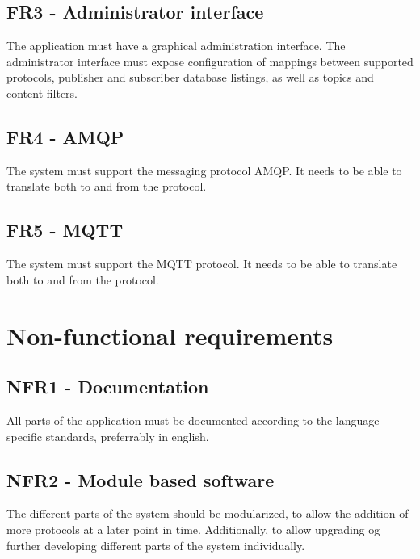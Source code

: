 \subsection{FR3 - Administrator interface}

The application must have a graphical administration interface. The administrator interface must expose configuration of mappings between supported protocols, publisher and subscriber database listings, as well as topics and content filters.

\subsection{FR4 - AMQP}

The system must support the messaging protocol AMQP. It needs to be able to translate both to and from the protocol.

\subsection{FR5 - MQTT}

The system must support the MQTT protocol. It needs to be able to translate both to and from the protocol.

\section{Non-functional requirements}

\subsection{NFR1 - Documentation}

All parts of the application must be documented according to the language specific standards, preferrably in english.

\subsection{NFR2 - Module based software}

The different parts of the system should be modularized, to allow the addition of more protocols at a later point in time. Additionally, to allow upgrading og further developing different parts of the system individually.


\cleardoublepage